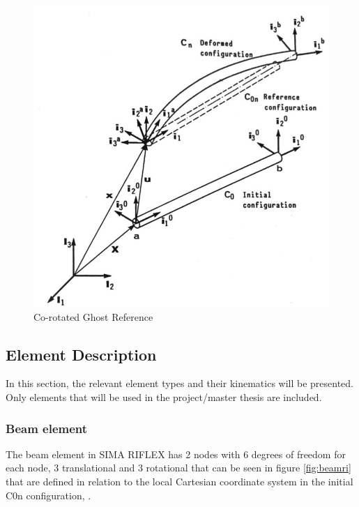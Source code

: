 \begin{figure}[H]
\centering
\includegraphics[scale=0.5]{figures/coro}
\caption[$\; \:$Co-rotated Ghost Reference]{Co-rotated Ghost Reference \cite{Mathisen1990} }
 \label{fig:coro}
\end{figure}

\subsection{Element Description}
In this section, the relevant element types and their kinematics will be presented. Only elements that will be used in the project/master thesis are included. 
\subsubsection{Beam element}
\noindent The beam element in SIMA RIFLEX has 2 nodes with 6 degrees of freedom for each node, 3 translational and 3 rotational that can be seen in figure \ref{fig:beamri} that are defined in relation to the local Cartesian coordinate system in the initial C0n configuration,
\cite{sintef2017}.

